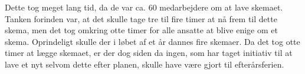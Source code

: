 Dette tog meget lang tid, da de var ca. 60 medarbejdere om at lave skemaet. Tanken forinden var, at det skulle tage tre til fire timer at nå frem til dette skema, men det tog omkring otte timer for alle ansatte at blive enige om et skema. Oprindeligt skulle der i løbet af et år dannes fire skemaer. Da det tog otte timer at lægge skemaet, er der dog siden da ingen, som har taget initiativ til at lave et nyt selvom dette efter planen, skulle have være gjort til efterårsferien.


